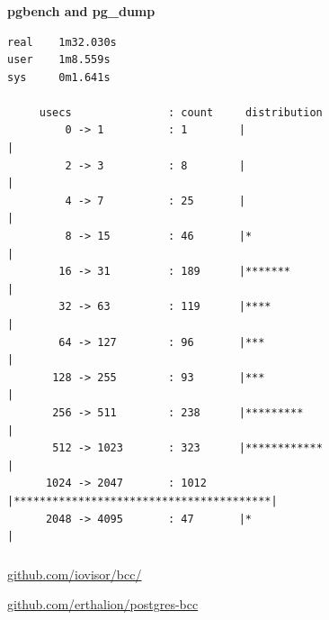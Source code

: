 \documentclass[usenames,dvipsnames, 18pt, compress, aspectratio=169]{beamer}
\begin{document}
\begin{frame}[fragile]{}
    \frametitle{}
    \begin{center}
    \textbf{pgbench and pg\_dump}

    \begin{verbatim}
real    1m32.030s
user    1m8.559s
sys     0m1.641s

     usecs               : count     distribution
         0 -> 1          : 1        |                                        |
         2 -> 3          : 8        |                                        |
         4 -> 7          : 25       |                                        |
         8 -> 15         : 46       |*                                       |
        16 -> 31         : 189      |*******                                 |
        32 -> 63         : 119      |****                                    |
        64 -> 127        : 96       |***                                     |
       128 -> 255        : 93       |***                                     |
       256 -> 511        : 238      |*********                               |
       512 -> 1023       : 323      |************                            |
      1024 -> 2047       : 1012     |****************************************|
      2048 -> 4095       : 47       |*                                       |
        \end{verbatim}

    \end{center}
\end{frame}




\begin{frame}
    \frametitle{}
    \begin{center}

        \begin{flushleft}
        \href{https://github.com/iovisor/bcc/}
             {\color{black}\LARGE{github.com/iovisor/bcc/}}

        \href{https://github.com/erthalion/postgres-bcc}
             {\color{black}\LARGE{github.com/erthalion/postgres-bcc}}
        \end{flushleft}

    \end{center}
\end{frame}
\end{document}
